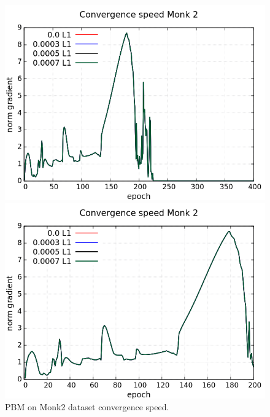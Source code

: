\begin{figure}[H]
	\centering
	\begin{minipage}[t]{0.5\linewidth}
		\includegraphics[width=\linewidth]{data/PBM/Monk2/Monk2_PBM_CS_standard.png}
	\end{minipage}%
	\begin{minipage}[t]{0.5\linewidth}
		\includegraphics[width=\linewidth]{data/PBM/Monk2/Monk2_PBM_CS_zoom.png}
	\end{minipage}
	\caption{PBM on Monk2 dataset convergence speed.}
\end{figure}
